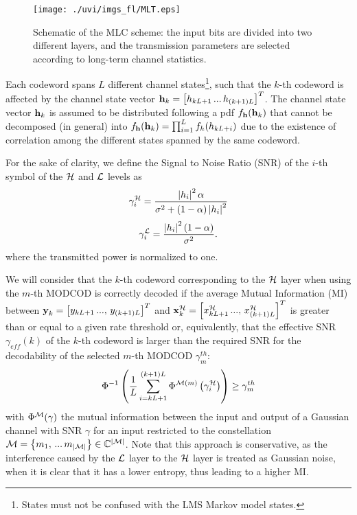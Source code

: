 \documentclass[journal,onecolumn,10pt,a4paper]{IEEEtran}
\newcommand{\field}[1]{\mathbb{#1}}
\begin{document}
\begin{figure}
\begin{center}

 \texttt{[image: ./uvi/imgs\_fl/MLT.eps]}
\caption{Schematic of the MLC scheme: the input bits are divided into two different layers, and the transmission parameters are selected according to long-term channel statistics.}
\label{f:MLT}\end{center}
\end{figure}

Each codeword spans $L$ different channel states\footnote{States must not be confused with the LMS Markov model states.}, such that the $k$-th codeword is affected by the channel state vector $\boldsymbol{\mathbf{h}}_k = \left[h_{kL+1}\,...\,h_{(k+1)L} \right]^T$. The channel state vector $\boldsymbol{\mathbf{h}}_k$ is assumed to be distributed following a pdf $f_{\boldsymbol{\mathbf{h}}}(\boldsymbol{\mathbf{h}}_k)$ that cannot be decomposed (in general) into $f_{\boldsymbol{\mathbf{h}}}(\boldsymbol{\mathbf{h}}_k) = \prod_{i=1}^L f_{h} (h_{kL+i})$ due to the existence of correlation among the different states spanned by the same codeword.

For the sake of clarity, we define the Signal to Noise Ratio (SNR) of the $i$-th symbol of the ${\cal H}$ and ${\cal L}$ levels as
\begin{equation}
\label{e:rhoH}
 \gamma_i^{\cal H} = \frac{\left| h_i \right| ^2 \alpha}{\sigma^2 + \left(1-\alpha\right) \left| h_i \right|^2}
\end{equation}
\begin{equation}
\label{e:rhoL}
 \gamma_i^{\cal L} = \frac{\left| h_i \right| ^2(1-\alpha)}{\sigma^2}.
\end{equation} where the transmitted power is normalized to one.


We will consider that the $k$-th codeword corresponding to the ${\cal H}$ layer when using the $m$-th MODCOD is correctly decoded if the average Mutual Information (MI) between $\boldsymbol{\mathbf{y}}_k = \left[ y_{kL+1}\,...,\, y_{(k+1)L}\right]^T$ and $\boldsymbol{\mathbf{x}}_k^{\cal H} = \left[x_{kL+1}^{\cal H}\,...,\, x_{(k+1)L}^{\cal H} \right]^T$ is greater than or equal to a given rate threshold or, equivalently, that the effective SNR $\gamma_{eff}\left( k \right)$ of the $k$-th codeword is larger than the required SNR for the decodability of the selected $m$-th MODCOD $\gamma^{th}_m$:
\begin{equation}
  \Phi^{-1}\left(\frac{1}{L}\sum_{i={kL+1}}^{(k+1)L} \Phi^{{\cal M}(m)} \left(\gamma_i^{\cal H} \right)\right) \geq \gamma^{th}_m
\end{equation}
with $\Phi^{\cal M} ( \gamma)$ the mutual information between the input and output of a Gaussian channel with SNR $\gamma$ for an input restricted to the constellation ${\cal M} = \left\{m_1,\, ...\, m_{|{\cal M}|} \right\} \in {\field C}^{|{\cal M}|}$. Note that this approach is conservative, as the interference caused by the ${\cal L}$ layer to the ${\cal H}$ layer is treated as Gaussian noise, when it is clear that it has a lower entropy, thus leading to a higher MI.
\end{document}
